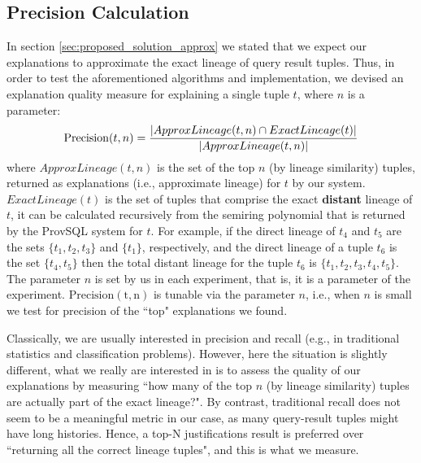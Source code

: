 \subsection{Precision Calculation}\label{sec:precision}
In section \ref{sec:proposed_solution_approx} we stated that we expect our explanations to approximate the exact lineage of query result tuples. 
Thus, in order to test the aforementioned algorithms and implementation, we devised an explanation quality measure for explaining a single tuple $t$, where $n$ is a parameter: 
\begin{equation*}
    \operatorname{Precision}(t, n) = \frac{|ApproxLineage(t, n) \cap ExactLineage(t)|}{|ApproxLineage(t, n)|}\\
\end{equation*}
where $ApproxLineage(t, n)$ is the set of the top $n$ (by lineage similarity) tuples, returned as explanations (i.e., approximate lineage) for $t$ by our system. $ExactLineage(t)$ is the set of tuples that comprise the exact \textbf{distant} lineage of $t$, it can be calculated recursively from the semiring polynomial that is returned by the ProvSQL system for $t$.
For example, if the direct lineage of $t_4$ and $t_5$ are the sets $\{t_1, t_2, t_3\}$ and $\{t_1\}$, respectively, and the direct lineage of a tuple $t_6$ is the set $\{t_4, t_5\}$ then the total distant lineage for the tuple $t_6$ is $\{t_1, t_2, t_3, t_4, t_5\}$.
The parameter $n$ is set by us in each experiment, that is, it is a parameter of the experiment. 
$\operatorname{Precision(t, n)}$ is tunable via the parameter $n$, i.e., when $n$ is small we test for precision of the ``top" explanations we found.\\
\par Classically, we are usually interested in precision and recall (e.g., in traditional statistics and classification problems). However, here the situation is slightly different, what we really are interested in is to assess the quality of our explanations by measuring ``how many of the top $n$ (by lineage similarity) tuples are actually part of the exact lineage?". By contrast, traditional recall does not seem to be a meaningful metric in our case, as many query-result tuples might have long histories. Hence, a top-N justifications result is preferred over ``returning all the correct lineage tuples", and this is what we measure.

